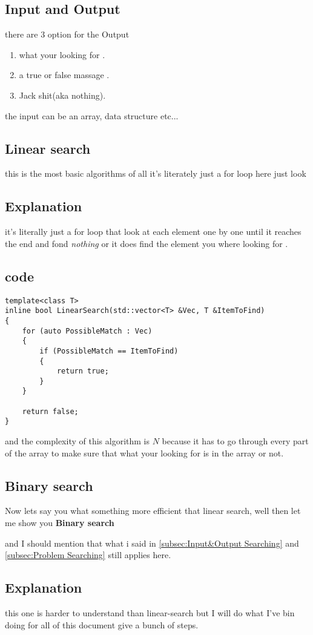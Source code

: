 \documentclass{article}
\begin{document}
\subsection{Input and Output} \label{subsec:Input&Output Searching}
there are 3 option for the Output 
\begin{enumerate}
\item what your looking for .
\item a true or false massage .
\item Jack shit(aka nothing).
\end{enumerate}
the input can be an array, data structure etc...
\subsection{Linear search}
this is the most basic algorithms of all it's literately just a for loop here just look 
\subsection{Explanation}
it's literally just a for loop that look at each element one by one until it reaches the end and fond \textit{nothing} or it does find the element you where looking for .
\subsection{code}
\begin{lstlisting} 
template<class T>
inline bool LinearSearch(std::vector<T> &Vec, T &ItemToFind)
{
	for (auto PossibleMatch : Vec)
	{
		if (PossibleMatch == ItemToFind)
		{
			return true;
		}
	}

	return false;
}
\end{lstlisting} 
and the complexity of this algorithm is $N$ because it has to go through every part of the array to make sure that what your looking for is in the array or not.
\subsection{Binary search}
Now lets say you what something more efficient that linear search, well then let me show you \textbf{Binary search}

and I should mention that what i said in \autoref{subsec:Input&Output Searching} and \autoref{subsec:Problem Searching} still applies here.
\subsection{Explanation}
this one is harder to understand than linear-search but I will do what I've bin doing for all of this document give a bunch  of steps.
\end{document}
